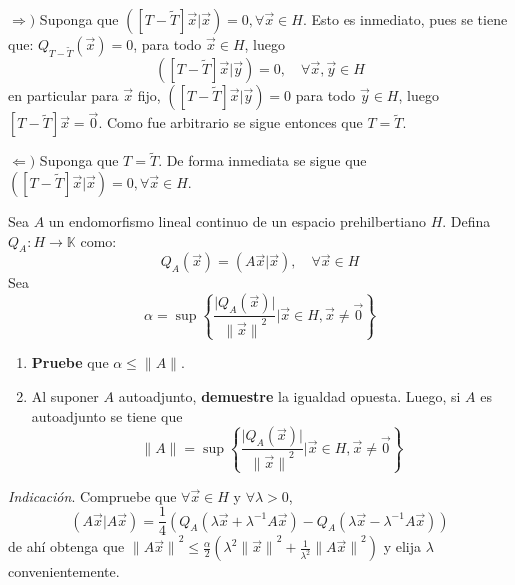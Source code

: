 \documentclass[12pt]{report}
\theoremstyle{largebreak}
\newcommand\abs[1]{\ensuremath{\big|#1\big|}}
\newcommand\cf[3]{\ensuremath{#1:#2\rightarrow#3}}
\newcommand\adj[1]{\ensuremath{\widetilde{#1}}}
\newcommand\pint[2]{\ensuremath{\left(#1\big|#2\right)}}
\newcommand\norm[1]{\ensuremath{\|#1\|}}
\begin{document}
\begin{sol}
        $\Rightarrow)$ Suponga que $\pint{\left[T-\adj{T}\right]\vec{x}}{\vec{x}}=0,\forall\vec{x}\in H$. Esto es inmediato, pues se tiene que: $Q_{T-\adj{T}}(\vec{x})=0$, para todo $\vec{x}\in H$, luego
        \begin{equation*}
            \pint{\left[T-\adj{T}\right]\vec{x}}{\vec{y}}=0,\quad\forall\vec{x},\vec{y}\in H
        \end{equation*}
        en particular para $\vec{x}$ fijo, $\pint{\left[T-\adj{T}\right]\vec{x}}{\vec{y}}=0$ para todo $\vec{y}\in H$, luego $\left[T-\adj{T}\right]\vec{x}=\vec{0}$. Como fue arbitrario se sigue entonces que $T=\adj{T}$.

        $\Leftarrow)$ Suponga que $T=\adj{T}$. De forma inmediata se sigue que $\pint{\left[T-\adj{T}\right]\vec{x}}{\vec{x}}=0,\forall\vec{x}\in H$.

    \end{sol}

    \begin{excer}
        Sea $A$ un endomorfismo lineal continuo de un espacio prehilbertiano $H$. Defina $\cf{Q_A}{H}{\mathbb{K}}$ como:
        \begin{equation*}
            Q_A(\vec{x})=\pint{A\vec{x}}{\vec{x}},\quad\forall\vec{x}\in H
        \end{equation*}
        Sea
        \begin{equation*}
            \alpha=\sup\left\{\frac{\abs{Q_A(\vec{x})}}{\norm{\vec{x}}^2}\big| \vec{x}\in H,\vec{x}\neq\vec{0} \right\}
        \end{equation*}
        \begin{enumerate}
            \item \textbf{Pruebe} que $\alpha\leq\norm{A}$.
            \item Al suponer $A$ autoadjunto, \textbf{demuestre} la igualdad opuesta. Luego, si $A$ es autoadjunto se tiene que
            \begin{equation*}
                \norm{A}=\sup\left\{\frac{\abs{Q_A(\vec{x})}}{\norm{\vec{x}}^2}\big| \vec{x}\in H,\vec{x}\neq\vec{0} \right\}
            \end{equation*}
        \end{enumerate}
        \textit{Indicación}. Compruebe que $\forall\vec{x}\in H$ y $\forall\lambda>0$,
        \begin{equation*}
            \pint{A\vec{x}}{A\vec{x}}=\frac{1}{4}\left(Q_A(\lambda\vec{x}+\lambda^{-1}A\vec{x})-Q_A(\lambda\vec{x}-\lambda^{-1}A\vec{x})\right)
        \end{equation*}
        de ahí obtenga que $\norm{A\vec{x}}^2\leq\frac{\alpha}{2}\left(\lambda^2\norm{\vec{x}}^2+\frac{1}{\lambda^2}\norm{A\vec{x}}^2 \right)$ y elija $\lambda$ convenientemente.
    \end{excer}
\end{document}
